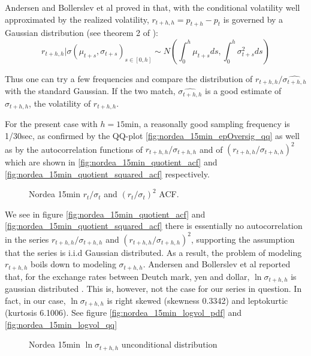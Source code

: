 \documentclass{book}
\begin{document}
Andersen and Bollerslev et al proved in \cite{Andersen03} that, with
the conditional volatility well approximated by the realized
volatility, $r_{t+h, h} = p_{t+h} - p_t$ is governed by a Gaussian
distribution (see theorem 2 of \cite{Andersen03}):
\[
r_{t+h, h} | \sigma(\mu_{t+s}, \sigma_{t+s})_{s \in [0, h]} \sim
N(\int_{0}^h \mu_{t+s} ds, \int_{0}^h \sigma_{t+s}^2 ds)
\]

Thus one can try a few frequencies and compare the distribution of
$r_{t+h, h}/\hat{\sigma_{t+h, h}}$ with the standard Gaussian. If the
two match, $\hat{\sigma_{t+h, h}}$ is a good estimate of $\sigma_{t+h,
  h}$, the volatility of $r_{t+h, h}$.

For the present case with $h = 15\text{min}$, a reasonally good
sampling frequency is 1/30sec, as confirmed by the QQ-plot
\ref{fig:nordea_15min_epOversig_qq} as well as by the autocorrelation
functions of $r_{t+h, h} / \sigma_{t+h, h}$ and of $(r_{t+h, h} /
\sigma_{t+h, h})^2$ which are shown in
\ref{fig:nordea_15min_quotient_acf} and
\ref{fig:nordea_15min_quotient_squared_acf} respectively.
\begin{figure}[htb!]
  \centering
  \caption{Nordea 15min $r_t/\sigma_t$ and $(r_t/\sigma_t)^2$ ACF.}
\end{figure}

We see in figure \ref{fig:nordea_15min_quotient_acf} and
\ref{fig:nordea_15min_quotient_squared_acf} there is essentially no
autocorrelation in the series $r_{t+h, h} / \sigma_{t+h, h}$ and
$(r_{t+h, h} / \sigma_{t+h, h})^2$, supporting the assumption that the
series is i.i.d Gaussian distributed. As a result, the problem of
modeling $r_{t+h, h}$ boils down to modeling $\sigma_{t+h,
  h}$. Andersen and Bollerslev et al reported that, for the exchange
rates between Deutch mark, yen and dollar, $\ln \sigma_{t+h, h}$ is
gaussian distributed \cite{Andersen03}. This is, however, not the case
for our series in question. In fact, in our case, $\ln \sigma_{t+h,
  h}$ is right skewed (skewness 0.3342) and leptokurtic (kurtosis
6.1006). See figure \ref{fig:nordea_15min_logvol_pdf} and
\ref{fig:nordea_15min_logvol_qq}
\begin{figure}[htb!]
  \centering
  \caption{Nordea 15min $\ln\sigma_{t+h, h}$ unconditional
    distribution}
\end{figure}
\end{document}
